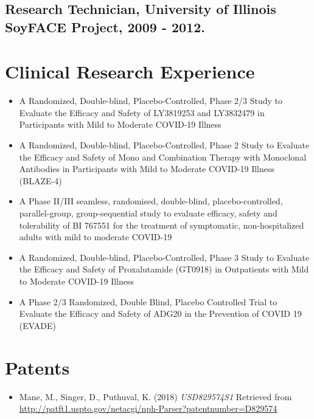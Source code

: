 \documentclass[letterpaper]{article}
\begin{document}
  \subsection*{Research Technician, University of Illinois SoyFACE Project, 2009 - 2012.}

\section*{Clinical Research Experience}

  \begin{itemize}

    \item A Randomized, Double-blind, Placebo-Controlled, Phase 2/3 Study to Evaluate the Efficacy and Safety of LY3819253 and LY3832479 in Participants with Mild to Moderate COVID-19 Illness
    \item A Randomized, Double-blind, Placebo-Controlled, Phase 2 Study to Evaluate the Efficacy and Safety of Mono and Combination Therapy with Monoclonal Antibodies in Participants with Mild to Moderate COVID-19 Illness (BLAZE-4)
    \item A Phase II/III seamless, randomised, double-blind, placebo-controlled, parallel-group, group-sequential study to evaluate efficacy, safety and tolerability of BI 767551 for the treatment of symptomatic, non-hospitalized adults with mild to moderate COVID-19
    \item A Randomized, Double-blind, Placebo-Controlled, Phase 3 Study to Evaluate the Efficacy and Safety of Proxalutamide (GT0918) in Outpatients with Mild to Moderate COVID-19 Illness
    \item A Phase 2/3 Randomized, Double Blind, Placebo Controlled Trial to Evaluate the Efficacy and Safety of ADG20 in the Prevention of COVID 19 (EVADE)

  \end{itemize}

\section*{Patents}

  \begin{itemize}
    \item Mane, M., Singer, D., Puthuval, K. (2018) {\it USD829574S1} Retrieved from \href{http://patft1.uspto.gov/netacgi/nph-Parser?patentnumber=D829574}{http://patft1.uspto.gov/netacgi/nph-Parser?patentnumber=D829574}
  \end{itemize}
\end{document}
